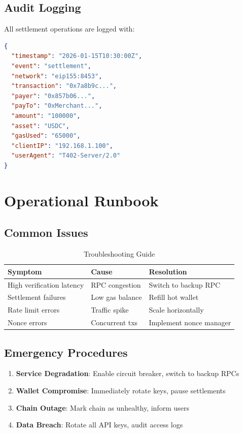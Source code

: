 \subsection{Audit Logging}

All settlement operations are logged with:

\begin{lstlisting}[language=json,caption={Audit log entry}]
{
  "timestamp": "2026-01-15T10:30:00Z",
  "event": "settlement",
  "network": "eip155:8453",
  "transaction": "0x7a8b9c...",
  "payer": "0x857b06...",
  "payTo": "0xMerchant...",
  "amount": "100000",
  "asset": "USDC",
  "gasUsed": "65000",
  "clientIP": "192.168.1.100",
  "userAgent": "T402-Server/2.0"
}
\end{lstlisting}

\section{Operational Runbook}
\label{sec:runbook}

\subsection{Common Issues}

\begin{table}[htbp]
\centering
\caption{Troubleshooting Guide}
\label{tab:troubleshooting}
\footnotesize
\begin{tabular}{p{3cm} p{4cm} p{4cm}}
\toprule
\textbf{Symptom} & \textbf{Cause} & \textbf{Resolution} \\
\midrule
High verification latency & RPC congestion & Switch to backup RPC \\
Settlement failures & Low gas balance & Refill hot wallet \\
Rate limit errors & Traffic spike & Scale horizontally \\
Nonce errors & Concurrent txs & Implement nonce manager \\
\bottomrule
\end{tabular}
\end{table}

\subsection{Emergency Procedures}

\begin{enumerate}
    \item \textbf{Service Degradation}: Enable circuit breaker, switch to backup RPCs
    \item \textbf{Wallet Compromise}: Immediately rotate keys, pause settlements
    \item \textbf{Chain Outage}: Mark chain as unhealthy, inform users
    \item \textbf{Data Breach}: Rotate all API keys, audit access logs
\end{enumerate}

